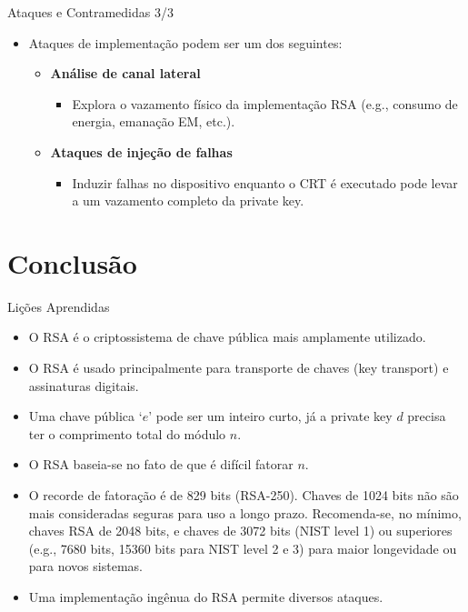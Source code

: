 \documentclass{beamer}
\begin{document}
\begin{frame}{Ataques e Contramedidas 3/3}

\begin{itemize}
    \item Ataques de implementação podem ser um dos seguintes:
    \begin{itemize}
        \vspace{0.5em}
        \item \textbf{Análise de canal lateral}
        \begin{itemize}
            \item Explora o vazamento físico da implementação RSA (e.g., consumo de energia, emanação EM, etc.).
        \end{itemize}
        \vspace{0.5em}
        \item \textbf{Ataques de injeção de falhas}
        \begin{itemize}
            \item Induzir falhas no dispositivo enquanto o CRT é executado pode levar a um vazamento completo da private key.
        \end{itemize}
    \end{itemize}
\end{itemize}

\end{frame}

\section{Conclusão}

\begin{frame}{Lições Aprendidas}

\begin{itemize}
    \item O RSA é o criptossistema de chave pública mais amplamente utilizado.
    \item O RSA é usado principalmente para transporte de chaves (key transport) e assinaturas digitais.
    \item Uma chave pública `$e$' pode ser um inteiro curto, já a private key $d$ precisa ter o comprimento total do módulo $n$.
    \item O RSA baseia-se no fato de que é difícil fatorar $n$.
    \item O recorde de fatoração é de 829 bits (RSA-250). Chaves de 1024 bits não são mais consideradas seguras para uso a longo prazo. Recomenda-se, no mínimo, chaves RSA de 2048 bits, e chaves de 3072 bits (NIST level 1) ou superiores (e.g., 7680 bits, 15360 bits para NIST level 2 e 3) para maior longevidade ou para novos sistemas.
    \item Uma implementação ingênua do RSA permite diversos ataques.
\end{itemize}

\end{frame}
\end{document}
